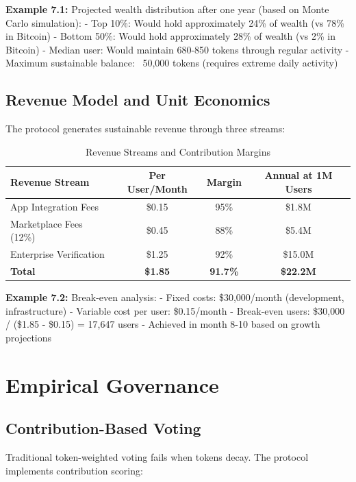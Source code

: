 \documentclass[11pt,letterpaper]{article}
\begin{document}
\textbf{Example 7.1:} Projected wealth distribution after one year (based on Monte Carlo simulation):
- Top 10\%: Would hold approximately 24\% of wealth (vs 78\% in Bitcoin)
- Bottom 50\%: Would hold approximately 28\% of wealth (vs 2\% in Bitcoin)
- Median user: Would maintain 680-850 tokens through regular activity
- Maximum sustainable balance: ~50,000 tokens (requires extreme daily activity)

\subsection{Revenue Model and Unit Economics}

The protocol generates sustainable revenue through three streams:

\begin{table}[h]
\centering
\caption{Revenue Streams and Contribution Margins}
\begin{tabular}{lccc}
\toprule
\textbf{Revenue Stream} & \textbf{Per User/Month} & \textbf{Margin} & \textbf{Annual at 1M Users} \\
\midrule
App Integration Fees & \$0.15 & 95\% & \$1.8M \\
Marketplace Fees (12\%) & \$0.45 & 88\% & \$5.4M \\
Enterprise Verification & \$1.25 & 92\% & \$15.0M \\
\midrule
\textbf{Total} & \textbf{\$1.85} & \textbf{91.7\%} & \textbf{\$22.2M} \\
\bottomrule
\end{tabular}
\end{table}

\textbf{Example 7.2:} Break-even analysis:
- Fixed costs: \$30,000/month (development, infrastructure)
- Variable cost per user: \$0.15/month
- Break-even users: \$30,000 / (\$1.85 - \$0.15) = 17,647 users
- Achieved in month 8-10 based on growth projections

\section{Empirical Governance}

\subsection{Contribution-Based Voting}

Traditional token-weighted voting fails when tokens decay. The protocol implements contribution scoring:
\end{document}
